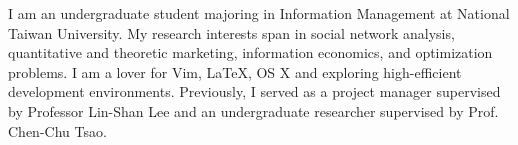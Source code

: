 

\begin{cvparagraph}

I am an undergraduate student majoring in Information Management 
at National Taiwan University. 
My research interests span in social network analysis, 
quantitative and theoretic marketing, information economics,
and optimization problems.
I am a lover for Vim, 
\LaTeX, OS X and exploring high-efficient development environments. 
Previously, I served as a project manager supervised by 
Professor Lin-Shan Lee and an 
undergraduate researcher supervised by Prof. Chen-Chu Tsao.
\end{cvparagraph}

